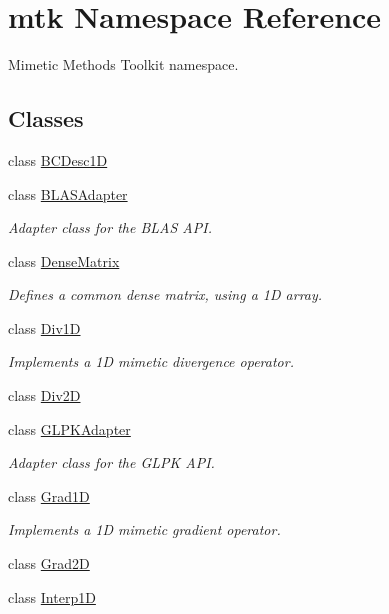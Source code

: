 \hypertarget{namespacemtk}{\section{mtk Namespace Reference}
\label{namespacemtk}
}


Mimetic Methods Toolkit namespace.  


\subsection*{Classes}
\begin{DoxyCompactItemize}
\item 
class \hyperlink{classmtk_1_1BCDesc1D}{B\-C\-Desc1\-D}
\item 
class \hyperlink{classmtk_1_1BLASAdapter}{B\-L\-A\-S\-Adapter}
\begin{DoxyCompactList}\small\item\em Adapter class for the B\-L\-A\-S A\-P\-I. \end{DoxyCompactList}\item 
class \hyperlink{classmtk_1_1DenseMatrix}{Dense\-Matrix}
\begin{DoxyCompactList}\small\item\em Defines a common dense matrix, using a 1\-D array. \end{DoxyCompactList}\item 
class \hyperlink{classmtk_1_1Div1D}{Div1\-D}
\begin{DoxyCompactList}\small\item\em Implements a 1\-D mimetic divergence operator. \end{DoxyCompactList}\item 
class \hyperlink{classmtk_1_1Div2D}{Div2\-D}
\item 
class \hyperlink{classmtk_1_1GLPKAdapter}{G\-L\-P\-K\-Adapter}
\begin{DoxyCompactList}\small\item\em Adapter class for the G\-L\-P\-K A\-P\-I. \end{DoxyCompactList}\item 
class \hyperlink{classmtk_1_1Grad1D}{Grad1\-D}
\begin{DoxyCompactList}\small\item\em Implements a 1\-D mimetic gradient operator. \end{DoxyCompactList}\item 
class \hyperlink{classmtk_1_1Grad2D}{Grad2\-D}
\item 
class \hyperlink{classmtk_1_1Interp1D}{Interp1\-D}

\end{DoxyCompactItemize}
